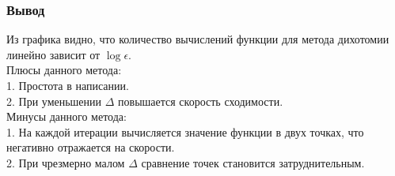 \subsubsection{Вывод}
{Из графика  видно, что количество вычислений функции для метода дихотомии линейно зависит от $\log\epsilon$. \\

Плюсы данного метода: \\
1. Простота в написании. \\
2. При уменьшении $\Delta$ повышается скорость сходимости. \\

Минусы данного метода: \\
1. На каждой итерации вычисляется значение функции в двух точках, что негативно отражается на скорости. \\
2. При чрезмерно малом $\Delta$ сравнение точек становится затруднительным.}
\newpage

